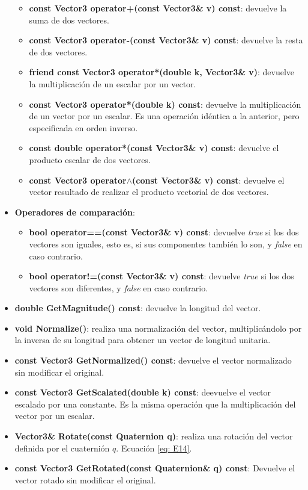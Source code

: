 \documentclass[12pt, a4paper]{report}
\begin{document}
\begin{itemize}
\begin{itemize}
\item \textbf{const Vector3 operator+(const Vector3\& v) const}: devuelve la suma de dos vectores.
\item \textbf{const Vector3 operator-(const Vector3\& v) const}: devuelve la resta de dos vectores.
\item \textbf{friend const Vector3 operator*(double k, Vector3\& v)}: devuelve la multiplicación de un escalar por un vector.
\item \textbf{const Vector3 operator*(double k) const}: devuelve la multiplicación de un vector por un escalar. Es una operación idéntica a la anterior, pero especificada en orden inverso.
\item \textbf{const double operator*(const Vector3\& v) const}: devuelve el producto escalar de dos vectores.
\item \textbf{const Vector3 operator$\wedge$(const Vector3\& v) const}: devuelve el vector resultado de realizar el producto vectorial de dos vectores.
\end{itemize}

\item \textbf{Operadores de comparación}:

\begin{itemize}
\item \textbf{bool operator==(const Vector3\& v) const}: devuelve \textit{true} si los dos vectores son iguales, esto es, si sus componentes también lo son, y \textit{false} en caso contrario.
\item \textbf{bool operator!=(const Vector3\& v) const}: devuelve \textit{true} si los dos vectores son diferentes, y \textit{false} en caso contrario.
\end{itemize}

\item \textbf{double GetMagnitude() const}: devuelve la longitud del vector.
\item \textbf{void Normalize()}: realiza una normalización del vector, multiplicándolo por la inversa de su longitud para obtener un vector de longitud unitaria.
\item \textbf{const Vector3 GetNormalized() const}: devuelve el vector normalizado sin modificar el original.
\item \textbf{const Vector3 GetScalated(double k) const}: deevuelve el vector escalado por una constante. Es la misma operación que la multiplicación del vector por un escalar.
\item \textbf{Vector3\& Rotate(const Quaternion q)}: realiza una rotación del vector definida por el cuaternión $q$. Ecuación \eqref{eq: E14}.
\item \textbf{const Vector3 GetRotated(const Quaternion\& q) const}: Devuelve el vector rotado sin modificar el original.

\end{itemize}
\end{document}
